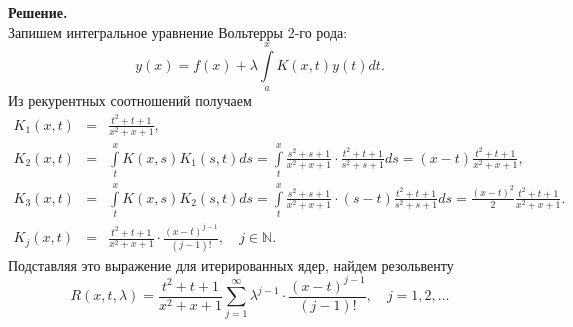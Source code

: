 \noindent
{\bf Решение.~}\\
\noindent
Запишем интегральное уравнение Вольтерры 2-го рода:
$$
y(x)=f(x) + \lambda\int\limits_a^x K(x,t)y(t)dt.
$$
Из рекурентных соотношений получаем
$$
\begin{array}{rcl}
K_1(x,t)&=&\displaystyle \frac{t^2+t+1}{x^2+x+1}, \\[12pt]
K_2(x,t)&=&\displaystyle\int\limits_t^x K(x,s)K_1(s,t)ds = \int\limits_t^x\frac{s^2+s+1}{x^2+x+1}\cdot \frac{t^2+t+1}{s^2+s+1}ds = (x-t)\frac{t^2+t+1}{x^2+x+1},\\[12pt]
K_3(x,t)&=&\displaystyle\int\limits_t^x K(x,s)K_2(s,t)ds = \int\limits_t^x\frac{s^2+s+1}{x^2+x+1}\cdot (s-t)\frac{t^2+t+1}{s^2+s+1} ds =\frac{(x-t)^2}{2}\frac{t^2+t+1}{x^2+x+1}.\\[12pt]
K_j(x,t)&=&\displaystyle\frac{t^2+t+1}{x^2+x+1}\cdot\frac{(x-t)^{j-1}}{(j-1)!},\quad j\in\mathbb{N}.
\end{array}
$$
Подставляя это выражение для итерированных ядер, найдем резольвенту
$$ 
R(x,t,\lambda)=\frac{t^2+t+1}{x^2+x+1}\sum_{j=1}^\infty\lambda^{j-1}\cdot\frac{(x-t)^{j-1}}{(j-1)!},
\quad j=1,2,\ldots
$$